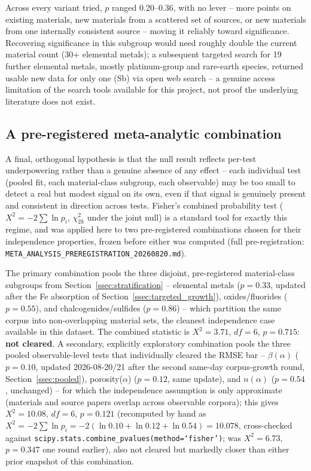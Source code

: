 \documentclass[aip,amsmath,amssymb,reprint]{revtex4-1}
\begin{document}
Across every variant tried, $p$ ranged 0.20--0.36, with no lever --
more points on existing materials, new materials from a scattered set
of sources, or new materials from one internally consistent source --
moving it reliably toward significance. Recovering significance in
this subgroup would need roughly double the current material count
(30+ elemental metals); a subsequent targeted search for 19 further
elemental metals, mostly platinum-group and rare-earth species,
returned usable new data for only one (Sb) via open web search -- a
genuine access limitation of the search tools available for this
project, not proof the underlying literature does not exist.

\subsection{A pre-registered meta-analytic combination}
\label{ssec:metaanalysis}

A final, orthogonal hypothesis is that the null result reflects
per-test underpowering rather than a genuine absence of any effect --
each individual test (pooled fit, each material-class subgroup, each
observable) may be too small to detect a real but modest signal on its
own, even if that signal is genuinely present and consistent in
direction across tests. Fisher's combined probability test
($X^2=-2\sum\ln p_i$, $\chi^2_{2k}$ under the joint null) is a standard
tool for exactly this regime, and was applied here to two
pre-registered combinations chosen for their independence properties,
frozen before either was computed (full pre-registration:
\texttt{META\_ANALYSIS\_PREREGISTRATION\_20260820.md}).

The primary combination pools the three disjoint, pre-registered
material-class subgroups from Section~\ref{ssec:stratification} --
elemental metals ($p=0.33$, updated after the Fe absorption of
Section~\ref{ssec:targeted_growth}), oxides/fluorides ($p=0.55$), and
chalcogenides/sulfides ($p=0.86$) -- which partition the same corpus
into non-overlapping material sets, the cleanest independence case
available in this dataset. The combined statistic is
$X^2=3.71$, $df=6$, $p=0.715$: \textbf{not cleared}. A secondary,
explicitly exploratory combination pools the three pooled
observable-level tests that individually cleared the RMSE bar --
$\beta(\alpha)$ ($p=0.10$, updated 2026-08-20/21 after the second
same-day corpus-growth round, Section~\ref{ssec:pooled}),
porosity($\alpha$) ($p=0.12$, same update), and
$n(\alpha)$ ($p=0.54$, unchanged) -- for which the independence
assumption is only approximate (materials and source papers overlap
across observable corpora); this gives $X^2=10.08$, $df=6$,
$p=0.121$ (recomputed by hand as $X^2=-2\sum\ln p_i =
-2(\ln 0.10+\ln 0.12+\ln 0.54)=10.078$, cross-checked against
\texttt{scipy.stats.combine\_pvalues(method=`fisher')}; was
$X^2=6.73$, $p=0.347$ one round earlier), also not cleared but
markedly closer than either prior snapshot of this combination.
\end{document}

